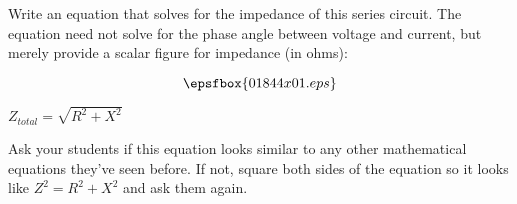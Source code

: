 

Write an equation that solves for the impedance of this series circuit.  The equation need not solve for the phase angle between voltage and current, but merely provide a scalar figure for impedance (in ohms):

$$\epsfbox{01844x01.eps}$$







$Z_{total} = \sqrt{R^2 + X^2}$







Ask your students if this equation looks similar to any other mathematical equations they've seen before.  If not, square both sides of the equation so it looks like $Z^2 = R^2 + X^2$ and ask them again.




